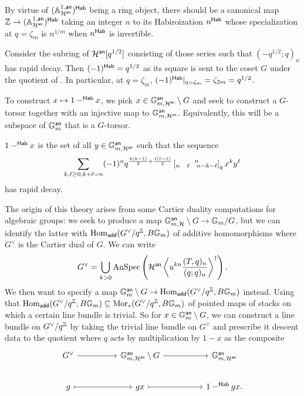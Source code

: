 By virtue of $(\mathbb{A}^{1,\mathsf{an}}_{\mathcal{H}^{\mathsf{an}}})^{\mathsf{Hab}}$ being a ring object, there should be a canonical map $\mathbb{Z}\to (\mathbb{A}^{1,\mathsf{an}}_{\mathcal{H}^{\mathsf{an}}})^{\mathsf{Hab}}$ taking an integer $n$ to its Habiroization $n^{\mathsf{Hab}}$ whose specialization at $q=\zeta_{m}$ is $n^{1/m}$ when $n^{\mathsf{Hab}}$ is invertible. 
\begin{example}
    Consider the subring of $\mathcal{H}^{\mathsf{an}}[q^{1/2}]$ consisting of those series such that $(-q^{1/2};q)_{n}$ has rapid decay. Then $(-1)^{\mathsf{Hab}}=q^{1/2}$ as its square is sent to the coset $G$ under the quotient of . In particular, at $q=\zeta_{m}$, $(-1)^{\mathsf{Hab}}|_{q=\zeta_{m}}=\zeta_{2m}=q^{1/2}$. 
\end{example}
To construct $x\mapsto 1-^{\mathsf{Hab}}x$, we pick $x\in\mathbb{G}_{m,\mathcal{H}^{\mathsf{an}}}^{\mathsf{an}}\setminus G$ and seek to construct a $G$-torsor together with an injective map to $\mathbb{G}_{m,\mathcal{H}^{\mathsf{an}}}^{\mathsf{an}}$. Equivalently, this will be a subspace of $\mathbb{G}_{m}^{\mathsf{an}}$ that is a $G$-torsor. 
\begin{definition}[$1-^{\Hab}x$]\label{def: 1-Habx}
    $1-^{\Hab}x$ is the set of all $y\in\mathbb{G}_{m,\mathcal{H}^{\mathsf{an}}}^{\mathsf{an}}$ such that the sequence 
    $$\sum_{k,\ell\geq0, k+\ell=n}(-1)^{n}q^{\frac{k(k-1)}{2}+\frac{\ell(\ell-1)}{2}}\left[\substack{n \\ n \hspace{0.3cm}\ell\hspace{0.3cm}n-k-\ell}\right]_{q}x^{k}y^{\ell}$$
    has rapid decay. 
\end{definition}
The origin of this theory arises from some Cartier duality computations for algebraic groups: we seek to produce a map $\mathbb{G}_{m,\mathcal{H}}^{\mathsf{an}}\setminus G\to \mathbb{G}_{m}/G$, but we can identify the latter with $\mathrm{Hom}_{\mathsf{add}}(G^{\vee}/q^{\mathbb{Z}},B\mathbb{G}_{m})$ of additive homomorphisms where $G^{\vee}$ is the Cartier dual of $G$. We can write 
$$G^{\vee}=\bigcup_{k>0}\mathrm{AnSpec}\left(\mathcal{H}^{\mathsf{an}}\left\langle u^{kn}\frac{(T,q)_{n}}{(q;q)_{n}}\right\rangle^{\dagger}\right).$$
We then want to specify a map $\mathbb{G}_{m}^{\mathsf{an}}\setminus G\to\mathrm{Hom}_{\mathsf{add}}(G^{\vee}/q^{\mathbb{Z}},B\mathbb{G}_{m})$ instead. Using that $\mathrm{Hom}_{\mathsf{add}}(G^{\vee}/q^{\mathbb{Z}},B\mathbb{G}_{m})\subseteq\mathrm{Mor}_{*}(G^{\vee}/q^{\mathbb{Z}},B\mathbb{G}_{m})$ of pointed maps of stacks on which a certain line bundle is trivial. So for $x\in \mathbb{G}_{m}^{\mathsf{an}}\setminus G$, we can construct a line bundle on $G^{\vee}/q^{\mathbb{Z}}$ by taking the trivial line bundle on $G^{\vee}$ and prescribe it descent data to the quotient where $q$ acts by multiplication by $1-x$ as the composite 
$$%
\begin{tikzcd}
	{G^{\vee}} && {\GG_{m,\Hcal^{\an}}^{\mathsf{an}}\setminus G} && {\GG_{m,\Hcal^{\an}}^{\an}} \\
	g && gx && {1-^{\Hab}gx.}
	\arrow[from=1-1, to=1-3]
	\arrow[from=1-3, to=1-5]
	\arrow[maps to, from=2-1, to=2-3]
	\arrow[maps to, from=2-3, to=2-5]
\end{tikzcd}$$
